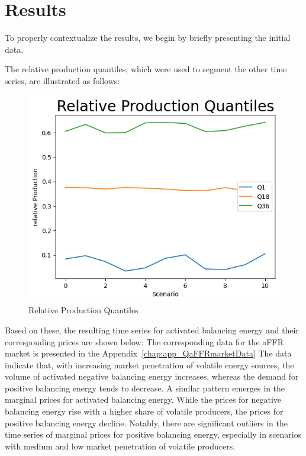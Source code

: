 \chapter{Results}

To properly contextualize the results, we begin by briefly presenting the initial data.


The relative production quantiles, which were used to segment the other time series, are illustrated as follows:

\begin{figure}[!h]
	\includegraphics[width=0.7\linewidth]{pictures/results/relativeProduktionQuantils.png}
	\caption{Relative Production Quantiles}
	\label{fig:Relative Production Quantiles}
\end{figure}

Based on these, the resulting time series for activated balancing energy and their corresponding prices are shown below:
The corresponding data for the aFFR market is presented in the Appendix~\ref{chap:app_QaFFRmarketData}
The data indicate that, with increasing market penetration of volatile energy sources, the volume of activated negative balancing energy increases,
whereas the demand for positive balancing energy tends to decrease.
A similar pattern emerges in the marginal prices for activated balancing energy.
While the prices for negative balancing energy rise with a higher share of volatile producers,
the prices for positive balancing energy decline.
Notably, there are significant outliers in the time series of marginal prices for positive balancing energy,
especially in scenarios with medium and low market penetration of volatile producers.

